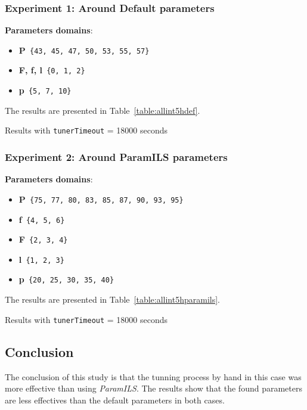 \subsubsection{Experiment 1: Around Default parameters}

{\bf Parameters domains}:

\begin{itemize}[itemsep=0.2mm]
	\item {\bf P}\texttt{ \{43, 45, 47, 50, 53, 55, 57\}}
	\item {\bf F, f, l}\texttt{ \{0, 1, 2\}}
	\item {\bf p}\texttt{ \{5, 7, 10\}}
\end{itemize}

The results are presented in Table~\ref{table:allint5hdef}.

\begin{table}[H] 
\caption{Results with \texttt{tunerTimeout} = 18000 seconds}
\centering 
\renewcommand{\arraystretch}{1.2}
\label{table:allint5hdef}
\end{table}

\subsubsection{ Experiment 2: Around ParamILS parameters}

{\bf Parameters domains}:

\begin{itemize}[itemsep=0.2mm]
	\item {\bf P}\texttt{ \{75, 77, 80, 83, 85, 87, 90, 93, 95\}}
	\item {\bf f}\texttt{ \{4, 5, 6\}}
	\item {\bf F}\texttt{ \{2, 3, 4\}}
	\item {\bf l}\texttt{ \{1, 2, 3\}}
	\item {\bf p}\texttt{ \{20, 25, 30, 35, 40\}}
\end{itemize}

The results are presented in Table~\ref{table:allint5hparamils}.

\begin{table}[H] 
\caption{Results with \texttt{tunerTimeout} = 18000 seconds}
\centering 
\renewcommand{\arraystretch}{1.2}
\label{table:allint5hparamils}
\end{table}

\subsection{Conclusion}

The conclusion of this study is that the tunning process by hand in this case was more effective than using {\it ParamILS}. The results show that the found parameters are less effectives than the default parameters in both cases.